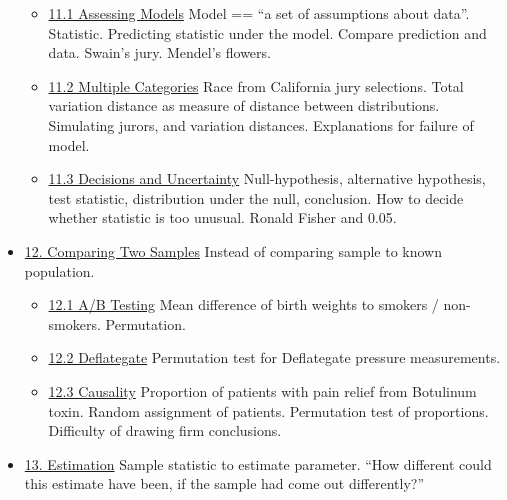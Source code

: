 \begin{itemize}
  \begin{itemize}
  \tightlist
  \item
    \href{notebooks/11/1/Assessing_Models.ipynb}{11.1 Assessing Models}
    Model == ``a set of assumptions about data''. Statistic. Predicting
    statistic under the model. Compare prediction and data. Swain's
    jury. Mendel's flowers.
  \item
    \href{notebooks/11/2/Multiple_Categories.ipynb}{11.2 Multiple
    Categories} Race from California jury selections. Total variation
    distance as measure of distance between distributions. Simulating
    jurors, and variation distances. Explanations for failure of model.
  \item
    \href{notebooks/11/3/Decisions_and_Uncertainty.ipynb}{11.3 Decisions
    and Uncertainty} Null-hypothesis, alternative hypothesis, test
    statistic, distribution under the null, conclusion. How to decide
    whether statistic is too unusual. Ronald Fisher and 0.05.
  \end{itemize}
\item
  \href{notebooks/12/Comparing_Two_Samples.ipynb}{12. Comparing Two
  Samples} Instead of comparing sample to known population.

  \begin{itemize}
  \tightlist
  \item
    \href{notebooks/12/1/AB_Testing.ipynb}{12.1 A/B Testing} Mean
    difference of birth weights to smokers / non-smokers. Permutation.
  \item
    \href{notebooks/12/2/Deflategate.ipynb}{12.2 Deflategate}
    Permutation test for Deflategate pressure measurements.
  \item
    \href{notebooks/12/3/Causality.ipynb}{12.3 Causality} Proportion of
    patients with pain relief from Botulinum toxin. Random assignment of
    patients. Permutation test of proportions. Difficulty of drawing
    firm conclusions.
  \end{itemize}
\item
  \href{notebooks/13/Estimation.ipynb}{13. Estimation} Sample statistic
  to estimate parameter. ``How different could this estimate have been,
  if the sample had come out differently?''


\end{itemize}
